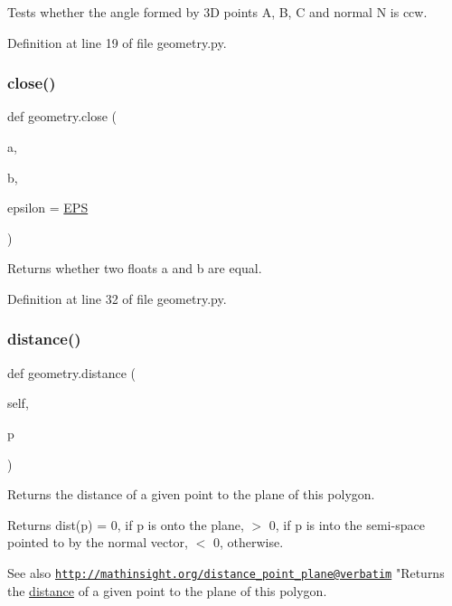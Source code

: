 \begin{DoxyVerb}Tests whether the angle formed by 3D points A, B, C and normal N is ccw.\end{DoxyVerb}
 

Definition at line 19 of file geometry.\+py.

\mbox{\label{namespacegeometry_a118331eb1c38459dd57dad62f75abea5}} 
\subsubsection{\texorpdfstring{close()}{close()}}
{\footnotesize\ttfamily def geometry.\+close (\begin{DoxyParamCaption}\item[{}]{a,  }\item[{}]{b,  }\item[{}]{epsilon = {\ttfamily \hyperlink{namespacegeometry_a543db87a5e9af9e1d17146559a540276}{E\+PS}} }\end{DoxyParamCaption})}

\begin{DoxyVerb}Returns whether two floats a and b are equal.\end{DoxyVerb}
 

Definition at line 32 of file geometry.\+py.

\mbox{\label{namespacegeometry_a9453ec6bad9d4ba50724a4df0b1a74ed}} 
\subsubsection{\texorpdfstring{distance()}{distance()}}
{\footnotesize\ttfamily def geometry.\+distance (\begin{DoxyParamCaption}\item[{}]{self,  }\item[{}]{p }\end{DoxyParamCaption})}



Returns the distance of a given point to the plane of this polygon. 

\begin{DoxyReturn}{Returns}
dist(p) = 0, if p is onto the plane, $>$ 0, if p is into the semi-\/space pointed to by the normal vector, $<$ 0, otherwise.
\end{DoxyReturn}
\begin{DoxySeeAlso}{See also}
\href{http://mathinsight.org/distance_point_plane@verbatim}{\tt http\+://mathinsight.\+org/distance\+\_\+point\+\_\+plane@verbatim} "Returns the \hyperlink{namespacegeometry_a9453ec6bad9d4ba50724a4df0b1a74ed}{distance} of a given point to the plane of this polygon. 
\end{DoxySeeAlso}



